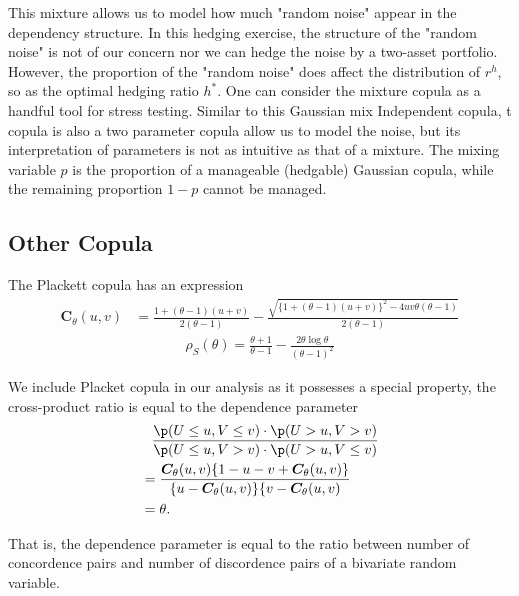 This mixture allows us to model how much "random noise" appear in the dependency structure.
In this hedging exercise, the structure of the "random noise" is not of our concern nor we can
hedge the noise by a two-asset portfolio.
However, the proportion of the "random noise" does affect the distribution of $r^h$,
so as the optimal hedging ratio $h^\ast$.
One can consider the mixture copula as a handful tool for stress testing.
Similar to this Gaussian mix Independent copula,
t copula is also a two parameter copula allow us to model the noise,
but its interpretation of parameters is not as intuitive as that of a mixture.
The mixing variable $p$ is the proportion of a manageable (hedgable) Gaussian copula,
while the remaining proportion $1-p$ cannot be managed.

\subsection{Other Copula}\label{subsec:other-copula}
The Plackett copula has an expression
\begin{align}
    \bm{C}_{\theta}(u,v) &= \frac{1+(\theta-1)(u+v)}{2(\theta-1)}
                         - \frac{\sqrt{\{
    1+(\theta-1)(u+v)\}^2 - 4uv\theta(\theta-1)}}{2(\theta-1)}
    \end{align}
\begin{align}
    \rho_S(\theta) = \frac{\theta+1}{\theta-1} - \frac{2\theta \log \theta}{(\theta-1)^2}
    \end{align}\medskip

We include Placket copula in our analysis as it possesses a special property,
the cross-product ratio is equal to the dependence parameter
\begin{align}
    &\phantom{=} \frac{\p(U \leq u, V \leq v) \cdot \p(U > u, V > v)}
    {\p(U \leq u, V > v) \cdot \p(U > u, V \leq v)}\nonumber\\
    &= \frac{\bm{C}_\theta(u,v)\{1-u-v+\bm{C}_\theta(u,v)\}}{\{u-\bm{C}_\theta(u,v)\}\{v-\bm{C}_\theta(u,v)}\nonumber\\
    &= \theta.
    \end{align}\medskip

That is, the dependence parameter is equal to the ratio between number of concordence pairs and number of discordence pairs of a bivariate random variable.
